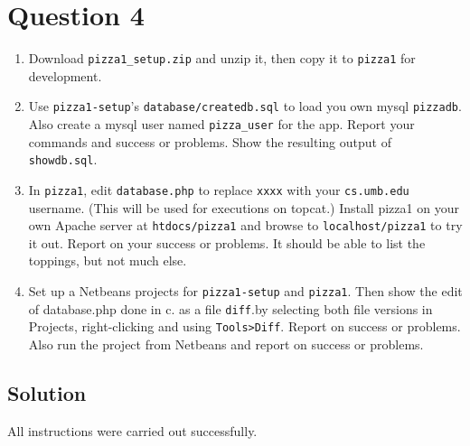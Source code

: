 
\section*{Question 4}

\begin{enumerate}[label=(\alph*)]
\item Download \texttt{pizza1\_setup.zip} and unzip it, then copy it to \texttt{pizza1} for development.

\item Use \texttt{pizza1-setup}'s \texttt{database/createdb.sql} to load you own mysql \texttt{pizzadb}.
Also create a mysql user named \texttt{pizza\_user} for the app.
Report your commands and success or problems.
Show the resulting output of \texttt{showdb.sql}.

\item In \texttt{pizza1}, edit \texttt{database.php} to replace \texttt{xxxx} with your \texttt{cs.umb.edu} username.
(This will be used for executions on topcat.) Install pizza1 on your own Apache server at \texttt{htdocs/pizza1} and browse to \texttt{localhost/pizza1} to try it out.
Report on your success or problems.
It should be able to list the toppings, but not much else.

\item Set up a Netbeans projects for \texttt{pizza1-setup} and \texttt{pizza1}.
Then show the edit of database.php done in c.
as a file \texttt{diff}.by selecting both file versions in Projects, right-clicking and using \texttt{Tools>Diff}.
 Report on success or problems.
Also run the project from Netbeans and report on success or problems.
\end{enumerate}

\subsection*{Solution}

All instructions were carried out successfully.

